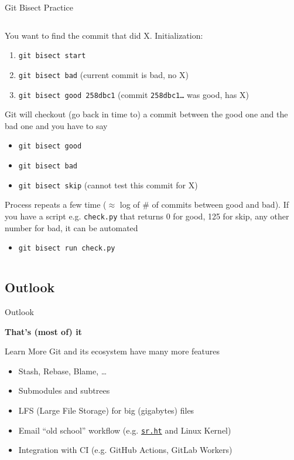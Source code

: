 \documentclass[xetex]{beamer}
\begin{document}
\begin{frame}{Git Bisect Practice}
  \begin{columns}
    \begin{column}{\linewidth}
        You want to find the commit that did X. Initialization:
        \begin{enumerate}
          \item \texttt{git bisect start}
          \item \texttt{git bisect bad} (current commit is bad, no X)
          \item \texttt{git bisect good 258dbc1} (commit \texttt{258dbc1\ldots}
            was good, has X)
        \end{enumerate}
        \pause
        Git will checkout (go back in time to) a commit between the good one
        and the bad one and you have to say
        \begin{itemize}
          \item \texttt{git bisect good}
          \item \texttt{git bisect bad}
          \item \texttt{git bisect skip} (cannot test this commit for X)
        \end{itemize}
        \pause
        Process repeats a few time ($\approx$ log of \# of commits between good
        and bad). If you have a script e.g. \texttt{check.py} that returns 0
        for good, 125 for skip, any other number for bad, it can be automated
        \begin{itemize}
          \item \texttt{git bisect run check.py}
        \end{itemize}
    \end{column}
  \end{columns}
\end{frame}

\subsection{Outlook}

\begin{frame}{Outlook}

  \centering
  {
    \Huge\bfseries
    That's (most of) it
  }
  \vspace{1cm}

  \begin{block}{Learn More}
    Git and its ecosystem have many more features
    \begin{itemize}
      \item Stash, Rebase, Blame, \ldots
      \item Submodules and subtrees
      \item LFS (Large File Storage) for big (gigabytes) files 
      \item Email ``old school'' workflow (e.g. \href{https://sr.ht}{\texttt{sr.ht}} and Linux Kernel)
      \item Integration with CI (e.g. GitHub Actions, GitLab Workers)
    \end{itemize}
  \end{block}
\end{frame}
\end{document}
